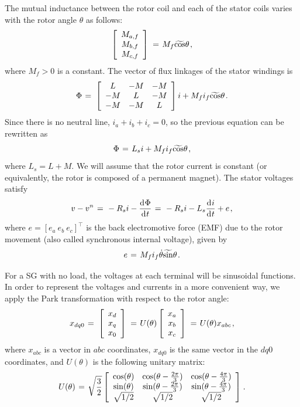 \documentclass[conference]{IEEEtran}
\newcommand{\BE}{\begin{equation}}
\newcommand{\BEQ}[1]{\BE\label{#1}} %
\newcommand{\m}      {{\hbox{\hskip 1pt}}}
\newcommand{\dd}     {{\rm d\hbox{\hskip 0.5pt}}}
\begin{document}
The mutual inductance between the rotor coil and each of the stator
coils varies with the rotor angle $\theta$ as follows:
$$ \left[\begin{array}{c} M_{a,f}\\ M_{b,f}\\ M_{c,f}\end{array}
   \right] \m=\m M_{f}\widetilde{\cos}\theta \m,$$
where $M_f>0$ is a constant. The vector of flux linkages of the stator
windings is
$$ \Phi \m=\m \left[\begin{array}{ccc} L & -M & -M\\ -M & L & -M\\
   -M & -M & L \end{array}\right]i + M_f i_f\widetilde{\cos}\theta
   \m.$$
Since there is no neutral line, $i_a+i_b+i_c=0$, so the previous
equation can be rewritten as 
$$\Phi \m=\m L_s i + M_f i_f \widetilde{\cos}\theta \m,$$
where $L_s=L+M$. We will assume that the rotor current is constant
(or equivalently, the rotor is composed of a permanent magnet). The
stator voltages satisfy
\BEQ{eq:SGTerminalVlotage}
   v - v^n \m=\m -R_{s}i-\frac{\dd\Phi}{\dd t} \m=\m -R_{s}i-L_{s}
   \frac{\dd i}{\dd t} + e \m,
\end{equation}
where $e=\left[e_a\ e_b\ e_c \right] ^\top$ is the back electromotive 
force (EMF) due to the rotor movement (also called synchronous 
internal voltage), given by
\BEQ{eq:emf}
   e \m=\m M_f i_f\dot{\theta}\widetilde{\sin}\theta \m.
\end{equation}

For a SG with no load, the voltages at each terminal
will be sinusoidal functions. In order to represent the voltages and
currents in a more convenient way, we apply the Park transformation
with respect to the rotor angle:
$$ x_{dq0} \m=\m \left[\begin{array}{c} x_{d}\\ x_{q}\\ x_{0}
   \end{array}\right] \m=\m U(\theta) \left[\begin{array}{c} x_{a}\\
   x_b\\ x_c\end{array}\right] \m=\m U(\theta) x_{abc} \m,$$
where $x_{abc}$ is a vector in $abc$ coordinates, $x_{dq0}$
is the same vector in the $dq0$ coordinates, and $U(\theta)$ is the
following unitary matrix:
$$ U(\theta) \m=\m \sqrt{\frac{3}{2}}\left[\begin{array}{ccc}
   \cos(\theta) & \cos(\theta-\frac{2\pi}{3}) & \cos(\theta-
   \frac{4\pi}{3})\\ \sin(\theta) & \sin(\theta-\frac{2\pi}{3})
   & \sin(\theta-\frac{4\pi}{3})\\ \sqrt{1/2} & \sqrt{1/2} & 
   \sqrt{1/2} \end{array}\right] \m.$$
\end{document}
